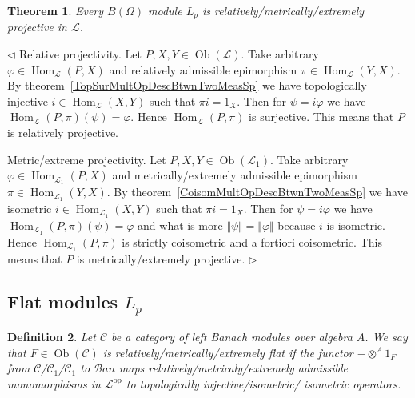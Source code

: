 \documentclass[12pt]{article}
\newtheorem{theorem}{Theorem}[subsection]
\newtheorem{definition}[theorem]{Definition}
\newenvironment{proof}{\par $\triangleleft$}{$\triangleright$}
\begin{document}
\begin{theorem} Every $B(\Omega)$ module $L_p$ is
    relatively/metrically/extremely projective in $\mathscr{L}$.
\end{theorem}
\begin{proof}
    Relative projectivity. Let $P,X,Y\in\operatorname{Ob}(\mathscr{L})$.
    Take arbitrary $\varphi\in\operatorname{Hom}_{\mathscr{L}}(P, X)$ and
    relatively admissible  epimorphism
    $\pi\in\operatorname{Hom}_{\mathscr{L}}(Y, X)$. By
    theorem~\ref{TopSurMultOpDescBtwnTwoMeasSp} we have topologically
    injective $i\in\operatorname{Hom}_{\mathscr{L}}(X, Y)$ such that
    $\pi i=1_{X}$. Then for $\psi=i\varphi$ we have
    $\operatorname{Hom}_{\mathscr{L}}(P,\pi)(\psi)=\varphi$. Hence
    $\operatorname{Hom}_{\mathscr{L}}(P,\pi)$ is surjective. This means that
    $P$ is relatively projective.

    Metric/extreme projectivity. Let
    $P,X,Y\in\operatorname{Ob}(\mathscr{L}_1)$. Take arbitrary
    $\varphi\in\operatorname{Hom}_{\mathscr{L}_1}(P, X)$ and
    metrically/extremely admissible epimorphism
    $\pi\in\operatorname{Hom}_{\mathscr{L}_1}(Y, X)$. By
    theorem~\ref{CoisomMultOpDescBtwnTwoMeasSp} we have isometric
    $i\in\operatorname{Hom}_{\mathscr{L}_1}(X, Y)$ such that
    $\pi i=1_{X}$. Then for $\psi=i\varphi$ we have
    $\operatorname{Hom}_{\mathscr{L}_1}(P,\pi)(\psi)=\varphi$ and what is more
    $\Vert\psi\Vert=\Vert\varphi\Vert$ because $i$ is isometric.
    Hence $\operatorname{Hom}_{\mathscr{L}_1}(P,\pi)$ is strictly coisometric
    and a fortiori coisometric. This means that $P$ is
    metrically/extremely projective.
\end{proof}


\subsection{Flat modules \texorpdfstring{$L_p$}{Lp}}

\begin{definition} Let $\mathscr{C}$ be a category of left Banach modules over
    algebra $A$. We say that $F\in\operatorname{Ob}(\mathscr{C})$ is
    relatively/metrically/extremely flat if the functor
    $-\mathop{\operatorname{\otimes}}^A 1_F$ from
    $\mathscr{C}$/$\mathscr{C}_1$/$\mathscr{C}_1$ to
    $\mathscr{B}an$ maps relatively/metricaly/extremely admissible monomorphisms
    in $\mathscr{L}^{\operatorname{op}}$ to topologically injective/isometric/
    isometric operators.
\end{definition}
\end{document}
